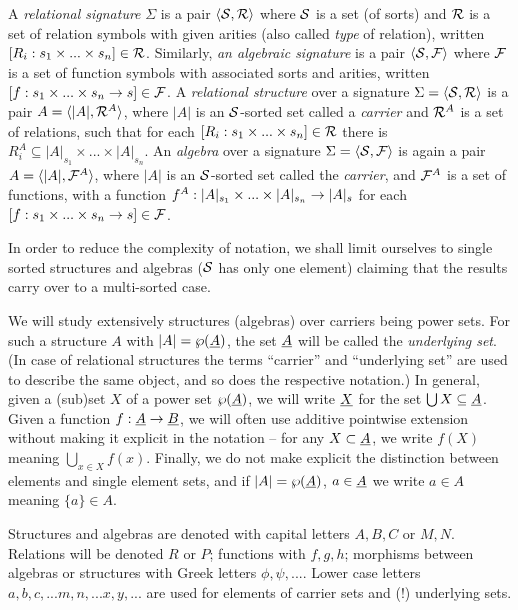 \documentclass[10pt]{article}
\begin{document}
A {\em relational signature\/}
$\Sigma$ is a pair $\langle{\cal S},{\cal R} \rangle$ where ${\cal S}$ is a set (of sorts)
and ${\cal R}$ is a set of relation symbols with given arities (also called
{\em type} of relation), written
$[R_i:s_1\times...\times s_n]\in {\cal R}$. Similarly, {\em an algebraic
signature\/} is a pair $\langle{\cal S},{\cal F} \rangle$ where 
${\cal F}$ is a set of function symbols with associated sorts and arities,
written $[f:s_1\times...\times s_n\rightarrow s]\in {\cal F}$. 
A {\em relational structure\/} over a signature $\Sigma=\langle{\cal S},{\cal R}\rangle$
is a pair $A= \langle|A|, {\cal R}^A\rangle$, where $|A|$ is
an ${\cal S}$-sorted set called a {\em carrier\/} and ${\cal R}^A$ is a set of
relations, such that for each $[R_i : s_1\times...\times s_n]\in {\cal R}$
there is $R_i^A \subseteq |A|_{s_1}\times...\times |A|_{s_n}$. 
An {\em algebra\/} over a signature $\Sigma=\langle{\cal S},{\cal F}\rangle$ 
is again a pair $A= \langle|A|, {\cal F}^A\rangle$, where $|A|$ is
an ${\cal S}$-sorted set called the {\em carrier}, and ${\cal F}^A$ is a set of
functions, with a function $f^A : |A|_{s_1}\times...\times |A|_{s_n} \rightarrow
|A|_s$ for each $[f : s_1\times...\times s_n\rightarrow s]\in {\cal F}$.

In order to reduce the complexity of notation, we shall limit
ourselves to single sorted structures and algebras 
(${\cal S}$ has only  one element)
claiming that the results carry over to a multi-sorted case. 


We will study extensively structures (algebras) over carriers being
power sets. 
For such a structure $A$ with $|A|=\wp(\underline {A})$, the
set $\underline {A}$ will be called the {\em underlying set}. 
(In case of relational structures the terms ``carrier'' and ``underlying
set'' are used to describe the same object, and so does the respective
notation.)
In general, given a (sub)set $X$ of a power set $\wp(\underline {A})$, 
we will write $\underline {X}$ for the set $\bigcup X\subseteq\underline {A}$. 
Given a function $f:\underline {A}\rightarrow \underline {B}$, we will often use additive pointwise extension
without making it explicit in the notation -- for any $X\subset \underline {A}$, we write
$f(X)$ meaning $\bigcup_{x\in X} f(x)$.
Finally, we do not make explicit the distinction
between elements and single element sets, and if $|A|=\wp(\underline {A})$, $a\in\underline {A}$ we write $a\in A$ meaning $\{a\}\in A$.

Structures and algebras are denoted with capital letters $A,B,C$
or $M,N$.
Relations will be denoted $R$ or $P$;
functions with $f,g,h$; morphisms between algebras or structures with
Greek letters $\phi,\psi,...$. Lower case letters $a,b,c,... m,n,... 
x,y,...$ are used for elements of carrier sets and (!) underlying sets. 
\end{document}

